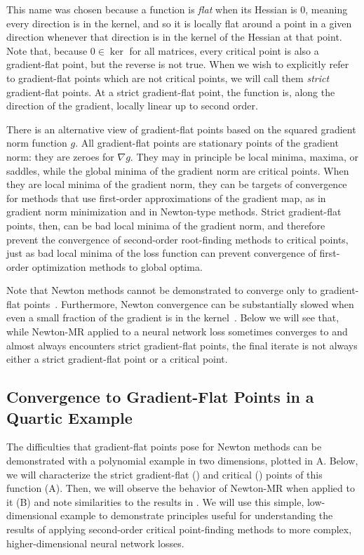 \documentclass[../../thesis.tex]{subfiles}
\begin{document}
This name was chosen because a function is \emph{flat}
when its Hessian is 0, meaning every direction is in the kernel,
and so it is locally flat around a point in a given direction
whenever that direction is in the kernel of the Hessian at that point.
Note that, because $0 \in \ker$ for all matrices,
every critical point is also a gradient-flat point,
but the reverse is not true.
When we wish to explicitly refer to gradient-flat points
which are not critical points,
we will call them \emph{strict} gradient-flat points.
At a strict gradient-flat point, the function is,
along the direction of the gradient,
locally linear up to second order.

There is an alternative view of gradient-flat points
based on the squared gradient norm function $g$.
All gradient-flat points are stationary points
of the gradient norm:
they are zeroes for $\nabla g$.
They may in principle be local minima, maxima, or saddles,
while the global minima of the gradient norm are critical points.
When they are local minima of the gradient norm,
they can be targets of convergence
for methods that use
first-order approximations of the gradient map,
as in gradient norm minimization and in Newton-type methods.
Strict gradient-flat points, then,
can be bad local minima of the gradient norm,
and therefore prevent the convergence of
second-order root-finding methods
to critical points,
just as bad local minima of the loss function
can prevent convergence of first-order optimization methods
to global optima.

Note that Newton methods cannot be demonstrated to converge
only to gradient-flat points~\cite{powell1970,byrd2004}.
Furthermore, Newton convergence can be substantially slowed
when even a small fraction of the gradient
is in the kernel~\cite{griewank1983}.
Below we will see that,
while Newton-MR applied to a neural network loss
sometimes converges to and almost always encounters strict gradient-flat points,
the final iterate is not always either
a strict gradient-flat point or a critical point.

\subsection{Convergence to Gradient-Flat Points in a Quartic Example}%

The difficulties that gradient-flat points pose for Newton methods
can be demonstrated with a polynomial example in two dimensions,
plotted in A.
Below,
we will characterize
the strict gradient-flat (\failcolor{})
and critical (\successcolor{}) points of this function
(A).
Then, we will observe the behavior of Newton-MR
when applied to it (B)
and note similarities to the results in .
We will use this simple, low-dimensional example
to demonstrate principles useful
for understanding the results of applying
second-order critical point-finding methods to more complex,
higher-dimensional neural network losses.
\end{document}
